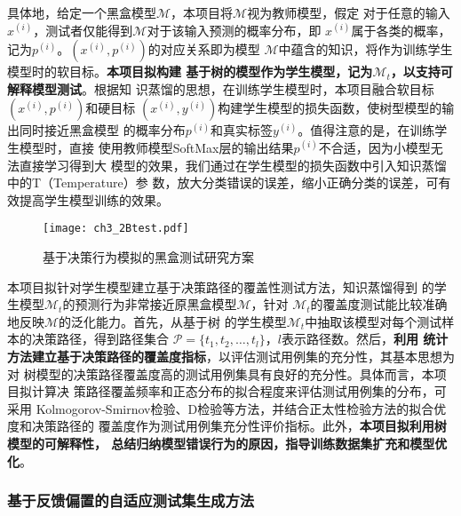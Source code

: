 具体地，给定一个黑盒模型$\mathcal M$，本项目将$\mathcal M$视为教师模型，假定
对于任意的输入$x^{(i)}$，测试者仅能得到$\mathcal M$对于该输入预测的概率分布，即
$x^{(i)}$属于各类的概率，记为$p^{(i)}$。$(x^{(i)}, p^{(i)})$的对应关系即为模型
$\mathcal M$中蕴含的知识，将作为训练学生模型时的软目标。\textbf{本项目拟构建
    基于树的模型作为学生模型，记为$\mathcal M_t$，以支持可解释模型测试}。根据知
识蒸馏的思想，在训练学生模型时，本项目融合软目标$(x^{(i)}, p^{(i)})$和硬目标
$(x^{(i)}, y^{(i)})$构建学生模型的损失函数，使树型模型的输出同时接近黑盒模型
的概率分布$p^{(i)}$和真实标签$y^{(i)}$。值得注意的是，在训练学生模型时，直接
使用教师模型SoftMax层的输出结果$p^{(i)}$不合适，因为小模型无法直接学习得到大
模型的效果，我们通过在学生模型的损失函数中引入知识蒸馏中的T（Temperature）参
数，放大分类错误的误差，缩小正确分类的误差，可有效提高学生模型训练的效果。

\begin{figure}[htp]
    \begin{small}
        \begin{center}
            \texttt{[image: ch3\_2Btest.pdf]}
        \end{center}
        \caption{基于决策行为模拟的黑盒测试研究方案}
        \label{fig:ch3:2Btest}
    \end{small}
\end{figure}


{本项目拟针对学生模型建立基于决策路径的覆盖性测试方法}，知识蒸馏得到
的学生模型$\mathcal M_t$的预测行为非常接近原黑盒模型$\mathcal M$，针对
$\mathcal M_t$的覆盖度测试能比较准确地反映$\mathcal M$的泛化能力。首先，从基于树
的学生模型$\mathcal M_t$中抽取该模型对每个测试样本的决策路径，得到路径集合
$\mathcal P=\{t_1, t_2,\dots, t_l\}$，$l$表示路径数。然后，\textbf{利用
    统计方法建立基于决策路径的覆盖度指标}，以评估测试用例集的充分性，其基本思想为对
树模型的决策路径覆盖度高的测试用例集具有良好的充分性。具体而言，本项目拟计算决
策路径覆盖频率和正态分布的拟合程度来评估测试用例集的分布，可采用
Kolmogorov-Smirnov检验、D检验等方法，并结合正太性检验方法的拟合优度和决策路径的
覆盖度作为测试用例集充分性评价指标。此外，\textbf{本项目拟利用树模型的可解释性，
    总结归纳模型错误行为的原因，指导训练数据集扩充和模型优化}。



\subsubsection{基于反馈偏置的自适应测试集生成方法}\label{ch3_3}

